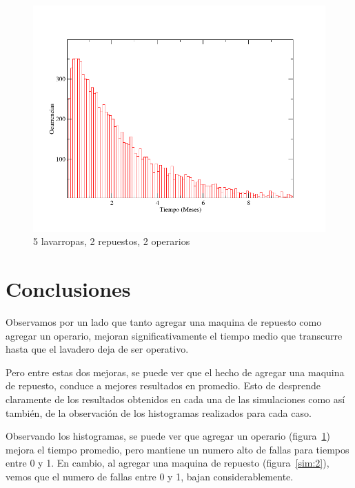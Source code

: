 \documentclass[10pt,a4paper]{article}
\begin{document}
\begin{figure}
  \centering
  \includegraphics[scale=0.45]{5-2-2.png} 
  \caption{5 lavarropas, 2 repuestos, 2 operarios}
  \label{sim:3}
\end{figure}


\section{Conclusiones}
Observamos por un lado que tanto agregar una maquina de repuesto
como agregar un operario, mejoran significativamente el tiempo medio
que transcurre hasta que el lavadero deja de ser operativo.

Pero entre estas dos mejoras, se puede ver que el hecho de agregar
una maquina de repuesto, conduce a mejores resultados en promedio.
Esto de desprende claramente de los resultados obtenidos en cada una
de las simulaciones como as\'i tambi\'en, de la observaci\'on de los histogramas 
realizados para cada caso.

Observando los histogramas, se puede ver que agregar un operario
(figura~\ref{sim:3}) mejora el tiempo promedio, pero mantiene un numero alto de
fallas para tiempos entre 0 y 1. En cambio, al agregar una maquina de
repuesto (figura~\ref{sim:2}), vemos que el numero de fallas entre 0 y 1, bajan
considerablemente.
\end{document}
